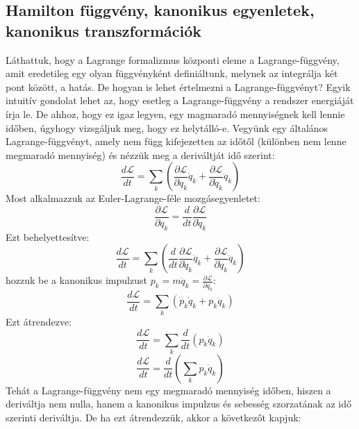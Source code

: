 \documentclass[a4paper,12pt]{article}
\begin{document}
\subsection{Hamilton függvény, kanonikus egyenletek, kanonikus transzformációk}
Láthattuk, hogy a Lagrange formalizmus központi eleme a Lagrange-függvény, amit eredetileg egy olyan függvényként definiáltunk, melynek az integrálja két pont között, a hatás. De hogyan is lehet értelmezni a Lagrange-függvényt?
Egyik intuitív gondolat lehet az, hogy esetleg a Lagrange-függvény a rendszer energiáját írja le. De ahhoz, hogy ez igaz legyen, egy magmaradó mennyiségnek kell lennie időben, úgyhogy vizsgáljuk meg, hogy ez helytálló-e.
Vegyünk egy általános Lagrange-függvényt, amely nem függ kifejezetten az időtől (különben nem lenne megmaradó mennyiség) és nézzük meg a deriváltját idő szerint:
\begin{equation}
    \frac{d\mathcal{L}}{dt} = \sum_k \left( \frac{\partial \mathcal{L}}{\partial q_k} \dot{q}_k + \frac{\partial \mathcal{L}}{\partial \dot{q}_k} \ddot{q}_k \right)
\end{equation}
Most alkalmazzuk az Euler-Lagrange-féle mozgásegyenletet:
\begin{equation}
    \frac{\partial \mathcal{L}}{\partial q_k} = \frac{d}{dt} \frac{\partial \mathcal{L}}{\partial \dot{q}_k}
\end{equation}
Ezt behelyettesítve:
\begin{equation}
    \frac{d\mathcal{L}}{dt} = \sum_k \left( \frac{d}{dt} \frac{\partial \mathcal{L}}{\partial \dot{q}_k} \dot{q}_k + \frac{\partial \mathcal{L}}{\partial \dot{q}_k} \ddot{q}_k \right)
\end{equation}
hozzuk be a kanonikus impulzust $ p_k = m\dot{q}_k = \frac{\partial \mathcal{L}}{\partial \dot{q}_k} $:
\begin{equation}
    \frac{d\mathcal{L}}{dt} = \sum_k \left( \dot{p}_k \dot{q}_k + p_k \ddot{q}_k \right)
\end{equation}
Ezt átrendezve:
\begin{equation}
    \frac{d\mathcal{L}}{dt} = \sum_k \frac{d}{dt} (p_k \dot{q}_k)
\end{equation}
\begin{equation}
    \frac{d\mathcal{L}}{dt} = \frac{d}{dt} \left( \sum_k p_k \dot{q}_k \right)
\end{equation}
Tehát a Lagrange-függvény nem egy megmaradó mennyiség időben, hiszen a deriváltja nem nulla, hanem a kanonikus impulzus és sebesség szorzatának az idő szerinti deriváltja. De ha ezt átrendezzük, akkor a következőt kapjuk:
\end{document}
